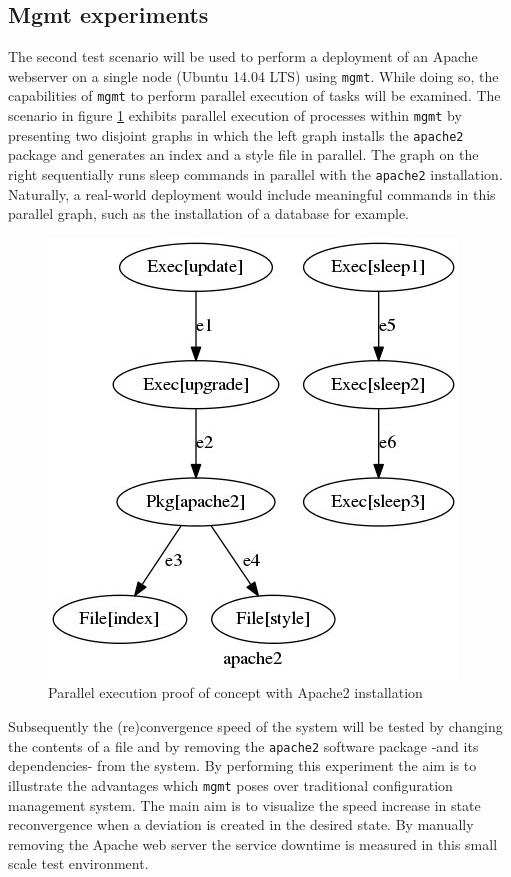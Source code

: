 \subsection{Mgmt experiments}
The second test scenario will be used to perform a deployment of an Apache webserver on a single node (Ubuntu 14.04 LTS) using \texttt{mgmt}. While doing so, the capabilities of \texttt{mgmt} to perform parallel execution of tasks will be examined. The scenario in figure \ref{fig:parallelexec} exhibits parallel execution of processes within \texttt{mgmt} by presenting two disjoint graphs in which the left graph installs the \texttt{apache2} package and generates an index and a style file in parallel. The graph on the right sequentially runs sleep commands in parallel with the \texttt{apache2} installation. Naturally, a real-world deployment would include meaningful commands in this parallel graph, such as the installation of a database for example.  

\begin{figure}[!ht]
  \begin{center}
          \includegraphics[scale=0.44]{img/graph.jpeg}
          \caption{Parallel execution proof of concept with Apache2 installation}
          \label{fig:parallelexec}
  \end{center}
\end{figure}

Subsequently the (re)convergence speed of the system will be tested by changing the contents of a file and by removing the \texttt{apache2} software package -and its dependencies- from the system. By performing this experiment the aim is to illustrate the advantages which \texttt{mgmt} poses over traditional configuration management system. The main aim is to visualize the speed increase in state reconvergence when a deviation is created in the desired state. By manually removing the Apache web server the service downtime is measured in this small scale test environment.

